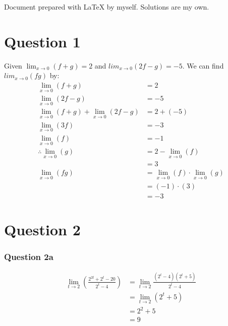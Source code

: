 \documentclass{article}
\begin{document}
\newcommand{\documentcourse}{MATH1851}
\newcommand{\documentnumber}{1}





Document prepared with LaTeX by myself. Solutions are my own.

\section*{Question 1}
Given $\lim_{x\to 0}(f+g)=2$ and $lim_{x\to 0}(2f-g)=-5$. We can find $lim_{x\to 0}(fg)$ by:
\begin{align*}
    \lim_{x\to 0}(f+g)                       & = 2                                       \\
    \lim_{x\to 0}(2f-g)                      & = -5                                      \\
    \lim_{x\to 0}(f+g) + \lim_{x\to 0}(2f-g) & = 2 + (-5)                                \\
    \lim_{x\to 0}(3f)                        & = -3                                      \\
    \lim_{x\to 0}(f)                         & = -1                                      \\
    \therefore \lim_{x\to 0}(g)              & = 2 - \lim_{x\to 0}(f)                    \\
                                             & = 3                                       \\
    \lim_{x\to 0}(fg)                        & = \lim_{x\to 0}(f) \cdot \lim_{x\to 0}(g) \\
                                             & = (-1) \cdot (3)                          \\
                                             & = -3
\end{align*}

\section*{Question 2}
\subsubsection*{Question 2a}
\begin{align*}
    \lim_{t\to 2}(\frac{2^{2t}+2^t-20}{2^t-4}) & = \lim_{t\to 2}\frac{(2^t-4)(2^t+5)}{2^t-4} \\
                                               & = \lim_{t\to 2}(2^t+5)                      \\
                                               & = 2^2+5                                     \\
                                               & = 9
\end{align*}
\end{document}
